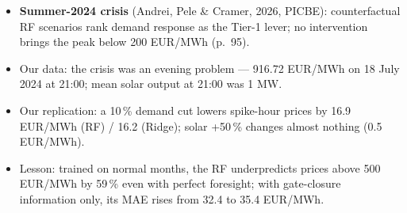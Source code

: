 \begin{itemize}\setlength{\itemsep}{2pt}
  \item \textbf{Summer-2024 crisis} (Andrei, Pele \& Cramer, 2026, PICBE): counterfactual RF scenarios rank demand response as the Tier-1 lever; no intervention brings the peak below 200 EUR/MWh (p.~95).
  \item Our data: the crisis was an evening problem --- 916.72 EUR/MWh on 18 July 2024 at 21:00; mean solar output at 21:00 was 1 MW.
  \item Our replication: a 10\,\% demand cut lowers spike-hour prices by 16.9 EUR/MWh (RF) / 16.2 (Ridge); solar +50\,\% changes almost nothing (0.5 EUR/MWh).
  \item Lesson: trained on normal months, the RF underpredicts prices above 500 EUR/MWh by 59\,\% even with perfect foresight; with gate-closure information only, its MAE rises from 32.4 to 35.4 EUR/MWh.
\end{itemize}

